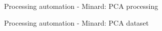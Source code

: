 \documentclass[xcolor=table]{beamer}
\begin{document}
\begin{frame}{Processing automation - Minard: PCA processing}
\noindent{}
\end{frame}

\begin{frame}{Processing automation - Minard: PCA dataset}
\noindent{}
\end{frame}
\end{document}
